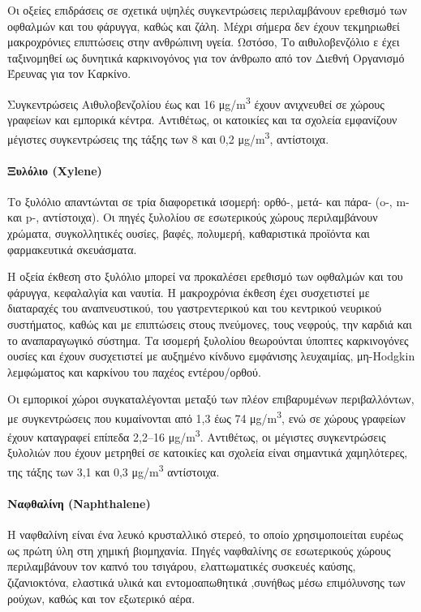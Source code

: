 Οι οξείες επιδράσεις σε σχετικά υψηλές συγκεντρώσεις περιλαμβάνουν ερεθισμό των οφθαλμών και του φάρυγγα, καθώς και ζάλη. Μέχρι σήμερα δεν έχουν τεκμηριωθεί μακροχρόνιες επιπτώσεις στην ανθρώπινη υγεία. 
Ωστόσο, Το αιθυλοβενζόλιο ε έχει ταξινομηθεί ως δυνητικά καρκινογόνος για τον άνθρωπο από τον Διεθνή Οργανισμό Έρευνας για τον Καρκίνο.

Συγκεντρώσεις Αιθυλοβενζολίου έως και 16 μg/m\textsuperscript{3} έχουν ανιχνευθεί σε χώρους γραφείων και εμπορικά κέντρα. Αντιθέτως, οι κατοικίες και τα σχολεία εμφανίζουν μέγιστες συγκεντρώσεις της τάξης των 8 και 0,2 μg/m\textsuperscript{3}, αντίστοιχα.

\paragraph{Ξυλόλιο (Xylene)}

Το ξυλόλιο απαντώνται σε τρία διαφορετικά ισομερή: ορθό-, μετά- και πάρα- (o-, m- και p-, αντίστοιχα). Οι πηγές ξυλολίου σε εσωτερικούς χώρους περιλαμβάνουν χρώματα, συγκολλητικές ουσίες, βαφές, πολυμερή, καθαριστικά προϊόντα και φαρμακευτικά σκευάσματα.

Η οξεία έκθεση στο ξυλόλιο μπορεί να προκαλέσει ερεθισμό των οφθαλμών και του φάρυγγα, κεφαλαλγία και ναυτία. Η μακροχρόνια έκθεση έχει συσχετιστεί με διαταραχές του αναπνευστικού, του γαστρεντερικού και του κεντρικού νευρικού συστήματος, καθώς και με επιπτώσεις στους πνεύμονες, τους νεφρούς, την καρδιά και το αναπαραγωγικό σύστημα. Τα ισομερή ξυλολίου θεωρούνται ύποπτες καρκινογόνες ουσίες και έχουν συσχετιστεί με αυξημένο κίνδυνο εμφάνισης λευχαιμίας, μη-Hodgkin λεμφώματος και καρκίνου του παχέος εντέρου/ορθού.

Οι εμπορικοί χώροι συγκαταλέγονται μεταξύ των πλέον επιβαρυμένων περιβαλλόντων, με συγκεντρώσεις που κυμαίνονται από 1,3 έως 74 μg/m\textsuperscript{3}, ενώ σε χώρους γραφείων έχουν καταγραφεί επίπεδα 2,2–16 μg/m\textsuperscript{3}. Αντιθέτως, οι μέγιστες συγκεντρώσεις ξυλολιών που έχουν μετρηθεί σε κατοικίες και σχολεία είναι σημαντικά χαμηλότερες, της τάξης των 3,1 και 0,3 μg/m\textsuperscript{3} αντίστοιχα.

\paragraph{Ναφθαλίνη (Naphthalene)}

Η ναφθαλίνη είναι ένα λευκό κρυσταλλικό στερεό, το οποίο χρησιμοποιείται ευρέως ως πρώτη ύλη στη χημική βιομηχανία.
 Πηγές ναφθαλίνης σε εσωτερικούς χώρους περιλαμβάνουν τον καπνό του τσιγάρου, ελαττωματικές συσκευές καύσης, ζιζανιοκτόνα, ελαστικά υλικά και εντομοαπωθητικά ,συνήθως μέσω επιμόλυνσης των ρούχων, καθώς και τον εξωτερικό αέρα.


